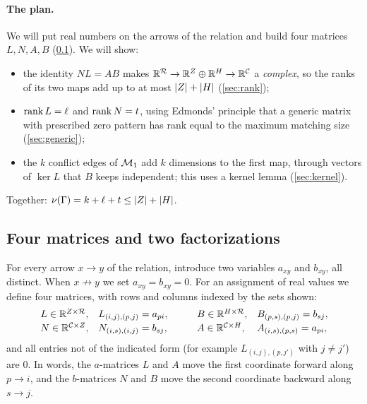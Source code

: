 \paragraph{The plan.}
We will put real numbers on the arrows of the relation and build four
matrices $L,N,A,B$ (\cref{sec:matrices}). We will show:
\begin{itemize}
\item the identity $NL=AB$ makes
$\mathbb R^{\mathcal R}\to\mathbb R^Z\oplus\mathbb R^H\to\mathbb R^{\mathcal C}$ a \emph{complex}, so the ranks of
its two maps add up to at most $\lvert Z\rvert+\lvert H\rvert$ (\cref{sec:rank});
\item $\operatorname{rank} L=\ell$ and $\operatorname{rank} N=t$, using Edmonds' principle that a generic
matrix with prescribed zero pattern has rank equal to the maximum matching
size (\cref{sec:generic});
\item the $k$ conflict edges of $\mathcal M_1$ add $k$ dimensions to the first
map, through vectors of $\ker L$ that $B$ keeps independent; this uses a
kernel lemma (\cref{sec:kernel}).
\end{itemize}
Together: $\nu(\Gamma)=k+\ell+t\le\lvert Z\rvert+\lvert H\rvert$.

\subsection{Four matrices and two factorizations}\label{sec:matrices}

For every arrow $x\to y$ of the relation, introduce two variables $a_{xy}$ and
$b_{xy}$, all distinct. When $x\not\to y$ we set $a_{xy}=b_{xy}=0$. For an
assignment of real values we define four matrices, with rows and columns
indexed by the sets shown:
\[
\begin{array}{ll}
 L\in\mathbb R^{Z\times\mathcal R}, & L_{(i,j),(p,j)}=a_{pi},\\[2pt]
 N\in\mathbb R^{\mathcal C\times Z}, & N_{(i,s),(i,j)}=b_{sj},
\end{array}\qquad
\begin{array}{ll}
 B\in\mathbb R^{H\times\mathcal R}, & B_{(p,s),(p,j)}=b_{sj},\\[2pt]
 A\in\mathbb R^{\mathcal C\times H}, & A_{(i,s),(p,s)}=a_{pi},
\end{array}
\]
and all entries not of the indicated form (for example
$L_{(i,j),(p,j')}$ with $j\ne j'$) are $0$. In words, the $a$-matrices $L$ and
$A$ move the first coordinate forward along $p\to i$, and the $b$-matrices
$N$ and $B$ move the second coordinate backward along $s\to j$.

